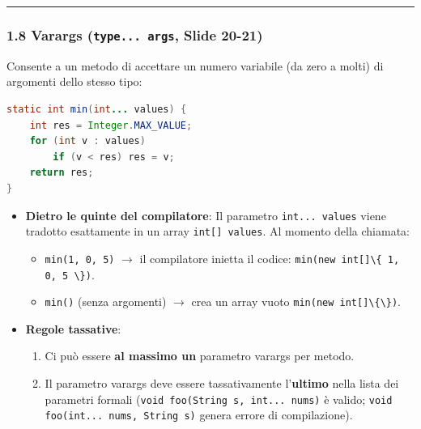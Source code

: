 \documentclass[11pt,a4paper]{article}
\newcommand{\passthrough}[1]{#1}
\providecommand{\tightlist}{\setlength{\itemsep}{0pt}\setlength{\parskip}{0pt}}
\begin{document}
\begin{center}\rule{0.5\linewidth}{0.5pt}\end{center}

\subsubsection{\texorpdfstring{1.8 Varargs (\texttt{type...\ args},
Slide
20-21)}{1.8 Varargs (type... args, Slide 20-21)}}\label{varargs-type...-args-slide-20-21}

Consente a un metodo di accettare un numero variabile (da zero a molti)
di argomenti dello stesso tipo:

\begin{lstlisting}[language=Java]
static int min(int... values) {
    int res = Integer.MAX_VALUE;
    for (int v : values)
        if (v < res) res = v;
    return res;
}
\end{lstlisting}

\begin{itemize}
\tightlist
\item
  \textbf{Dietro le quinte del compilatore}: Il parametro
  \passthrough{\lstinline!int... values!} viene tradotto esattamente in
  un array \passthrough{\lstinline!int[] values!}. Al momento della
  chiamata:

  \begin{itemize}
  \tightlist
  \item
    \passthrough{\lstinline!min(1, 0, 5)!} \(\rightarrow\) il
    compilatore inietta il codice:
    \passthrough{\lstinline!min(new int[]\{ 1, 0, 5 \})!}.
  \item
    \passthrough{\lstinline!min()!} (senza argomenti) \(\rightarrow\)
    crea un array vuoto \passthrough{\lstinline!min(new int[]\{\})!}.
  \end{itemize}
\item
  \textbf{Regole tassative}:

  \begin{enumerate}
  \def\labelenumi{\arabic{enumi}.}
  \tightlist
  \item
    Ci può essere \textbf{al massimo un} parametro varargs per metodo.
  \item
    Il parametro varargs deve essere tassativamente l'\textbf{ultimo}
    nella lista dei parametri formali
    (\passthrough{\lstinline!void foo(String s, int... nums)!} è valido;
    \passthrough{\lstinline!void foo(int... nums, String s)!} genera
    errore di compilazione).
  \end{enumerate}
\end{itemize}
\end{document}
